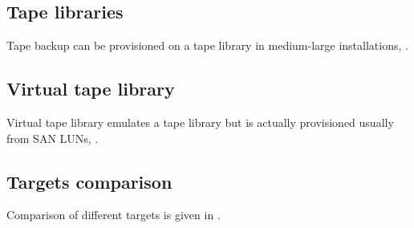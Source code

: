 \subsection{Tape libraries}
\label{sec:tape-libraries}

Tape backup can be provisioned on a tape library in medium-large
installations, .

\subsection{Virtual tape library}
\label{sec:virtual-tape-library}

Virtual tape library emulates a tape library but is actually provisioned
usually from SAN LUNs, .

\subsection{Targets comparison}
\label{sec:targets-comparison}

Comparison of different targets is given in .
